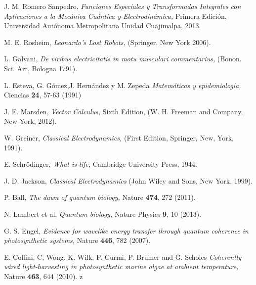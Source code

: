 \documentclass[letterpaper,12pt,oneside]{book}
\begin{document}
 \begin{thebibliography}{99}



J. M. Romero Sanpedro, {\it Funciones Especiales y Transformadas Integrales con Aplicaciones a la Mec\'anica Cu\'antica y Electrodin\'amica,} Primera Edici\'on, Universidad Aut\'onoma Metropolitana Unidad Cuajimalpa, 2013.

M. E. Rosheim, {\it  Leonardo's Lost Robots,} (Springer, New York 2006).

L. Galvani, {\it  De viribus electricitatis in motu musculari commentarius,} (Bonon. Sci. Art, Bologna 1791).

L. Esteva, G. G\'omez,J. Hern\'andez y M. Zepeda {\it Matem\'aticas y epidemiolog\'ia,} Ciencias {\bf 24}, 57-63  (1991)

  J. E. Marsden, {\it Vector Calculus,} Sixth Edition, (W. H. Freeman and Company, New York, 2012).

W. Greiner, {\it Classical Electrodynamics,} (First Edition, Springer, New, York, 1991).

E. Schr\"odinger, {\it What is life,} Cambridge University Press, 1944.

J. D. Jackson, {\it  Classical Electrodynamics}  (John Wiley and Sons, New York, 1999).

P. Ball, {\it The dawn of quantum biology,} Nature {\bf 474}, 272  (2011).

N. Lambert et al, {\it Quantum biology,} Nature Physics {\bf 9}, 10  (2013).

G. S. Engel, {\it Evidence for wavelike energy transfer through quantum coherence in photosynthetic systems,} Nature {\bf 446}, 782  (2007).

E. Collini, C, Wong, K. Wilk, P. Curmi, P. Brumer and G. Scholes {\it Coherently wired light-harvesting in photosynthetic marine algae at ambient temperature,} Nature {\bf 463}, 644  (2010).
z

\end{thebibliography}



  
\end{document}
